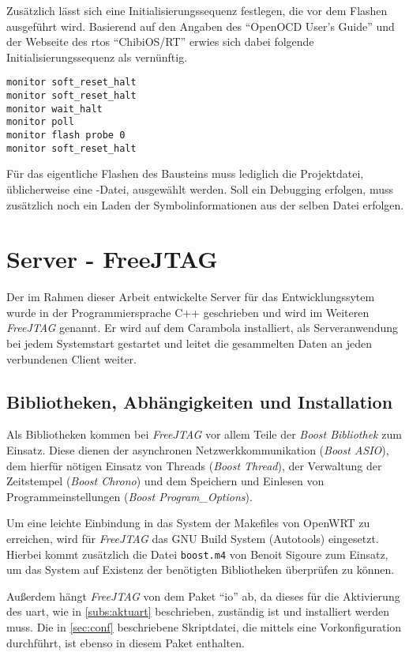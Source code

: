 Zusätzlich lässt sich eine Initialisierungssequenz festlegen, die vor dem
Flashen ausgeführt wird. Basierend auf den Angaben des "`OpenOCD User's
Guide"'\cite{OOCD} und der Webseite des \gls{rtos} "`ChibiOS/RT"'\cite{CHIB}
erwies sich dabei folgende Initialisierungssequenz als vernünftig.
\begin{lstlisting}
monitor soft_reset_halt
monitor soft_reset_halt
monitor wait_halt
monitor poll
monitor flash probe 0
monitor soft_reset_halt
\end{lstlisting}
Für das eigentliche Flashen des Bausteins muss lediglich die Projektdatei,
üblicherweise eine -Datei, ausgewählt werden. Soll ein
Debugging erfolgen, muss zusätzlich noch ein Laden der Symbolinformationen aus
der selben Datei erfolgen.
\section{Server - FreeJTAG}
Der im Rahmen dieser Arbeit entwickelte Server für das Entwicklungssytem wurde
in der Programmiersprache C++ geschrieben und wird im Weiteren \emph{FreeJTAG}
genannt. Er wird auf dem Carambola installiert, als Serveranwendung bei jedem
Systemstart gestartet und leitet die gesammelten Daten an jeden verbundenen Client weiter.

\subsection{Bibliotheken, Abhängigkeiten und Installation}
Als Bibliotheken kommen bei \emph{FreeJTAG} vor allem Teile der \emph{Boost Bibliothek}
zum Einsatz. Diese dienen der asynchronen Netzwerkkommunikation (\emph{Boost
ASIO}), dem hierfür nötigen Einsatz von Threads (\emph{Boost Thread}), der
Verwaltung der Zeitstempel (\emph{Boost Chrono}) und dem Speichern und
Einlesen von Programmeinstellungen (\emph{Boost Program\_Options}).

Um eine leichte Einbindung in das System der Makefiles von OpenWRT zu erreichen,
wird für \emph{FreeJTAG} das GNU Build System (Autotools) eingesetzt. Hierbei
kommt zusätzlich die Datei \texttt{boost.m4} von Benoit Sigoure\cite{GITH01} zum
Einsatz, um das System auf Existenz der benötigten Bibliotheken überprüfen zu
können.

Außerdem hängt \emph{FreeJTAG} von dem Paket "`io"' ab, da dieses für die Aktivierung
des \gls{uart}, wie in \autoref{subs:aktuart} beschrieben, zuständig ist und
installiert werden muss. Die in \autoref{sec:conf} beschriebene Skriptdatei,
die mittels  eine Vorkonfiguration durchführt, ist
ebenso in diesem Paket enthalten.

